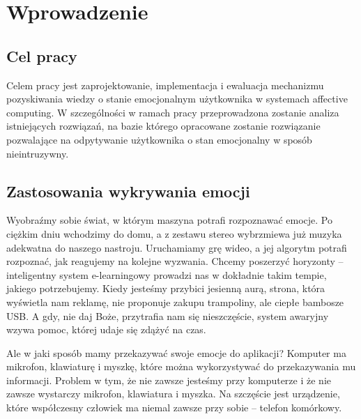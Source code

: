 \chapter{Wprowadzenie}
\label{cha:wprowadzenie}


\section{Cel pracy}
\label{sec:celPracy}

Celem pracy jest zaprojektowanie, implementacja i ewaluacja mechanizmu pozyskiwania wiedzy o stanie emocjonalnym użytkownika w systemach affective computing. W szczególności w ramach pracy przeprowadzona zostanie analiza istniejących rozwiązań, na bazie którego opracowane zostanie rozwiązanie pozwalające na odpytywanie użytkownika o stan emocjonalny w sposób nieintruzywny.


\section{Zastosowania wykrywania emocji}
\label{sec:zastosowaniaWykrywaniaEmocji}

Wyobraźmy sobie świat, w którym maszyna potrafi rozpoznawać emocje. Po ciężkim dniu wchodzimy do domu, a z zestawu stereo wybrzmiewa już muzyka adekwatna do naszego nastroju. Uruchamiamy grę wideo, a jej algorytm potrafi rozpoznać, jak reagujemy na kolejne wyzwania. Chcemy poszerzyć horyzonty – inteligentny system e-learningowy prowadzi nas w dokładnie takim tempie, jakiego potrzebujemy. Kiedy jesteśmy przybici jesienną aurą, strona, która wyświetla nam reklamę, nie proponuje zakupu trampoliny, ale ciepłe bambosze USB. A gdy, nie daj Boże, przytrafia nam się nieszczęście, system awaryjny wzywa pomoc, której udaje się zdążyć na czas.

Ale w jaki sposób mamy przekazywać swoje emocje do aplikacji? Komputer ma mikrofon, klawiaturę i myszkę, które można wykorzystywać do przekazywania mu informacji. Problem w tym, że nie zawsze jesteśmy przy komputerze i że nie zawsze wystarczy mikrofon, klawiatura i myszka. Na szczęście jest urządzenie, które współczesny człowiek ma niemal zawsze przy sobie – telefon komórkowy.



